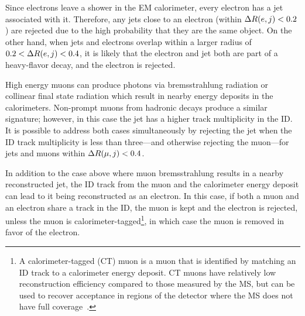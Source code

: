 Since electrons leave a shower in the EM calorimeter, every electron has a jet associated with it.
Therefore, any jets close to an electron (within $\Delta R(e,j) < 0.2$) are rejected due to the high probability that they are the same object.
On the other hand, when jets and electrons overlap within a larger radius of $0.2 < \Delta R(e,j) < 0.4$, it is likely that the electron and jet both are part of a heavy-flavor decay, and the electron is rejected.

High energy muons can produce photons via bremsstrahlung radiation or collinear final state radiation which result in nearby energy deposits in the calorimeters.
Non-prompt muons from hadronic decays produce a similar signature; however, in this case the jet has a higher track multiplicity in the ID.
It is possible to address both cases simultaneously by rejecting the jet when the ID track multiplicity is less than three---and otherwise rejecting the muon---for jets and muons within $\Delta R(\mu,j) < 0.4$.

In addition to the case above where muon bremsstrahlung results in a nearby reconstructed jet, the ID track from the muon and the calorimeter energy deposit can lead to it being reconstructed as an electron.
In this case, if both a muon and an electron share a track in the ID, the muon is kept and the electron is rejected, unless the muon is calorimeter-tagged\footnote{A calorimeter-tagged (CT) muon is a muon that is identified by matching an ID track to a calorimeter energy deposit.  CT muons have relatively low reconstruction efficiency compared to those measured by the MS, but can be used to recover acceptance in regions of the detector where the MS does not have full coverage~\cite{2016.muon-reconstruction-13tev}.}, in which case the muon is removed in favor of the electron.

